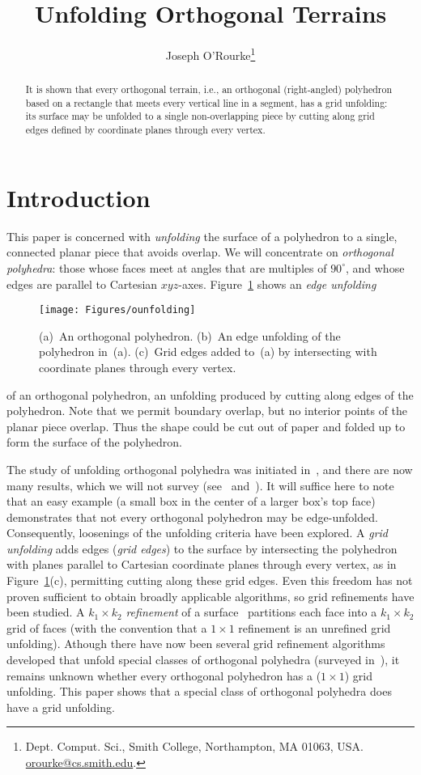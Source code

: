 \pdfoutput=1  \documentclass[]{article}
\title{Unfolding Orthogonal Terrains}
\author{Joseph O'Rourke\thanks{Dept. Comput. Sci., Smith College, Northampton, MA
      01063, USA.
      \protect\url{orourke@cs.smith.edu}.}
}
\newcommand{\figlab}[1]{\label{fig:#1}}
\newcommand{\figref}[1]{\ref{fig:#1}}
\begin{document}
\maketitle

\begin{abstract}
It is shown that every orthogonal terrain, i.e., an orthogonal (right-angled)
polyhedron based on a rectangle that meets every vertical line in a segment,
has a grid unfolding: its surface may be unfolded to a single non-overlapping piece
by cutting along grid edges defined by coordinate planes through every vertex.
\end{abstract}

\section{Introduction}
This paper is concerned with \emph{unfolding} the surface of a polyhedron
to a single, connected planar piece that avoids overlap.
We will concentrate on 
\emph{orthogonal polyhedra}: those whose faces meet at angles
that are multiples of $90^\circ$, and whose edges are parallel to
Cartesian $xyz$-axes.
Figure~\figref{ounfolding} shows an \emph{edge unfolding}
\begin{figure}[htbp]
\centering
\texttt{[image: Figures/ounfolding]}
\caption{(a)~An orthogonal polyhedron.
(b)~An edge unfolding of the polyhedron in~(a).
(c)~Grid edges added to~(a) by intersecting with coordinate planes
through every vertex.}
\figlab{ounfolding}
\end{figure}
of an orthogonal polyhedron, an unfolding produced by cutting
along edges of the polyhedron.
Note that we permit boundary overlap, but no interior points of
the planar piece overlap.
Thus the shape could be cut out of paper and folded up to form the 
surface of the polyhedron.

The study of unfolding orthogonal polyhedra was
initiated in~\cite{bddloorw-uscop-98}, and there are now many
results, which we will not survey 
(see~\cite{o-uop-07} and~\cite{do-gfalop-07}).
It will suffice here to note that an easy example (a small box in
the center of a larger box's top face) demonstrates that
not every orthogonal polyhedron may be edge-unfolded.
Consequently, 
loosenings of the unfolding criteria
have been explored.
A \emph{grid unfolding} adds edges 
(\emph{grid edges}) 
to the surface by intersecting the polyhedron
with planes parallel to Cartesian coordinate planes through every
vertex, as in
Figure~\figref{ounfolding}(c), permitting cutting along these
grid edges.
Even this freedom has not proven sufficient to obtain broadly
applicable algorithms, so
grid refinements have been studied.
A $k_1 {\times} k_2$ \emph{refinement} of a surface~\cite{do-op04-05}
partitions each face into a $k_1 {\times} k_2$ grid of faces
(with the convention that a
$1 {\times} 1$ refinement is an unrefined grid unfolding).
Athough there have now been several grid refinement algorithms
developed that unfold special classes of orthogonal polyhedra
(surveyed in~\cite{o-uop-07}),
it remains unknown whether every orthogonal polyhedron has
a ($1 {\times} 1$) grid unfolding.
This paper shows that a special class of orthogonal polyhedra
does have a grid unfolding.
\end{document}
